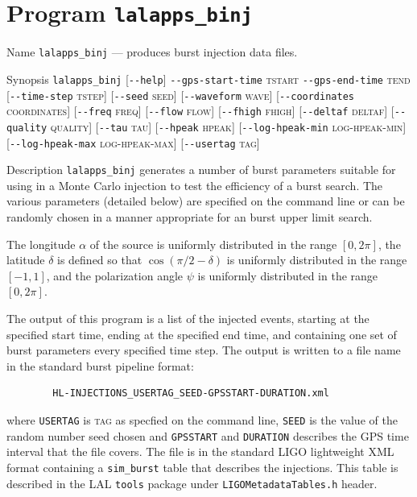 \section{Program \texttt{lalapps\_binj}}
\label{program:lalapps-binj}

\begin{entry}
\item[Name]
\verb$lalapps_binj$ --- produces burst injection data files.

\item[Synopsis]
\verb$lalapps_binj$ 
[\verb$--help$]
\verb$--gps-start-time$ \textsc{tstart} 
\verb$--gps-end-time$ \textsc{tend} 
[\verb$--time-step$ \textsc{tstep}]
[\verb$--seed$ \textsc{seed}]
[\verb$--waveform$ \textsc{wave}]
[\verb$--coordinates$ \textsc{coordinates}]
[\verb$--freq$ \textsc{freq}]
[\verb$--flow$ \textsc{flow}]
[\verb$--fhigh$ \textsc{fhigh}]
[\verb$--deltaf$ \textsc{deltaf}]
[\verb$--quality$ \textsc{quality}]
[\verb$--tau$ \textsc{tau}]
[\verb$--hpeak$ \textsc{hpeak}]
[\verb$--log-hpeak-min$ \textsc{log-hpeak-min}]
[\verb$--log-hpeak-max$ \textsc{log-hpeak-max}]
[\verb$--usertag$ \textsc{tag}]

\item[Description] 
\verb$lalapps_binj$
generates a number of burst  parameters suitable  for using in a Monte
Carlo injection to test the efficiency of a burst search.  The  various
parameters (detailed  below)  are specified on the command line or can be
randomly chosen in a manner appropriate for an burst upper limit
search.

The longitude $\alpha$ of the source is uniformly distributed in the
range $[0,2\pi]$, the latitude $\delta$ is defined so that $\cos(\pi/2 - 
\delta)$ is uniformly distributed in the range $[-1,1]$,  and the 
polarization angle $\psi$  is uniformly distributed in the
range $[0,2\pi]$.

The output of this program  is  a  list  of  the  injected events,  starting
at  the specified start time, ending at the specified end time, and containing
one set  of burst parameters every specified time step.  The output
is written to a file name in the standard burst pipeline format:
\begin{center}
\begin{verbatim}
        HL-INJECTIONS_USERTAG_SEED-GPSSTART-DURATION.xml
\end{verbatim}
\end{center}
where \verb$USERTAG$ is \textsc{tag} as specfied on the command line, 
\verb$SEED$ is the  value  of  the random number seed chosen and 
\verb$GPSSTART$ and \verb$DURATION$ describes the GPS time interval that
the file covers. The file is in the standard LIGO lightweight XML format
containing a \texttt{sim\_burst} table that describes the injections.
This table is described in the LAL \texttt{tools} package under
\texttt{LIGOMetadataTables.h} header.  


\end{entry}
